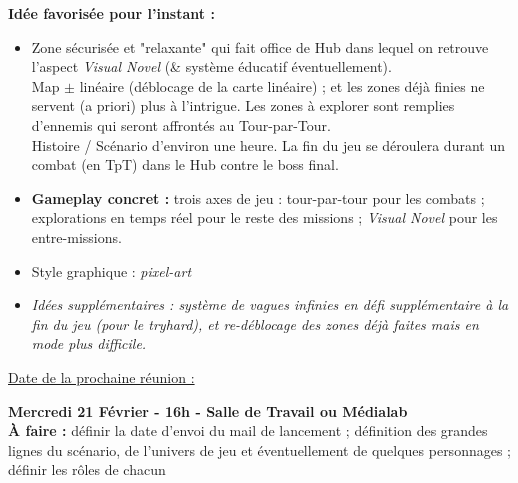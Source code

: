 \documentclass[a4paper, 12pt]{report}
\begin{document}
\textbf{Idée favorisée pour l'instant :}
\begin{itemize}[label=$\bullet$]

\item Zone sécurisée et "relaxante" qui fait office de Hub dans lequel on retrouve l'aspect \textit{Visual Novel} (\& système éducatif éventuellement).\\
Map $\pm$ linéaire (déblocage de la carte linéaire) ; et les zones déjà finies ne servent (a priori) plus à l'intrigue. Les zones à explorer sont remplies d'ennemis qui seront affrontés au Tour-par-Tour.
\\

Histoire / Scénario d'environ une heure. La fin du jeu se déroulera durant un combat (en TpT) dans le Hub contre le boss final.
\\

\item \textbf{Gameplay concret :} trois axes de jeu : tour-par-tour pour les combats ; explorations en temps réel pour le reste des missions ; \textit{Visual Novel} pour les entre-missions.
\\

\item Style graphique : \textit{pixel-art}
\\

\item \textit{Idées supplémentaires : système de vagues infinies en défi supplémentaire à la fin du jeu (pour le tryhard), et re-déblocage des zones déjà faites mais en mode plus difficile.\\}

\end{itemize}

\underline{Date de la prochaine réunion :\\}
\begin{center}
\textbf{Mercredi 21 Février - 16h - Salle de Travail ou Médialab}\\

\textbf{À faire :} définir la date d'envoi du mail de lancement ; définition des grandes lignes du scénario, de l'univers de jeu et éventuellement de quelques personnages ; définir les rôles de chacun
\end{center}
\end{document}
